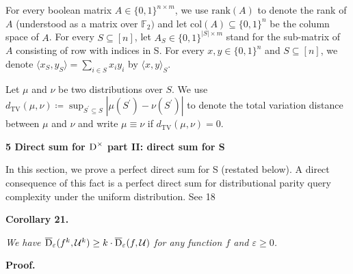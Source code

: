 For every boolean matrix $A\in\{0,1\}^{n\times m}$, we use $\mathrm{rank}(A)$ to denote the rank of $A$ (understood as a matrix over $\mathbb{F}_{2})$ and let $\mathrm{col}(A)\subseteq\{0,1\}^{n}$ be the column space of $A$. For every $S\subseteq[n]$, let $A_{S}\in\{0,1\}^{|S|\times m}$ stand for the sub-matrix of $A$ consisting of row with indices in S. For every $x,y\in\{0,1\}^{n}$ and $S\subseteq[n]$, we denote $\langle x_{S},y_{S}\rangle=\sum_{i\in S}x_{i}y_{i}$ by $\langle x,y\rangle_{S}$.\par




Let $\mu$ and $\nu$ be two distributions over $S$. We use $d_{\mathrm{TV}}(\mu,\nu)\coloneqq\sup_{S^{\prime}\subseteq S}|\mu(S^{\prime})-\nu(S^{\prime})|$ to denote the total variation distance between $\mu$ and $\nu$ and write $\mu\equiv\nu$ if $d_{\mathrm{TV}}(\mu,\nu)=0$.\par






\par\medskip\noindent\textbf{
5 Direct sum for ${\textup{D}}^{\times}$ part II: direct sum for S
}\par




In this section, we prove a perfect direct sum for S (restated below). A direct consequence of this fact is a perfect direct sum for distributional parity query complexity under the uniform distribution.
See 18\par





\par\medskip\noindent\textbf{
\textbf{Corollary 21}\textbf{.}
}\par



\emph{We have $\overline{{\textup{D}}}_{\varepsilon}(f^{k},\mathcal{U}^{k})\geq k\cdot\overline{{\textup{D}}}_{\varepsilon}(f,\mathcal{U})$ for any function $f$ and $\varepsilon\geq 0$.}\par






\par\medskip\noindent\textbf{Proof.}\par




